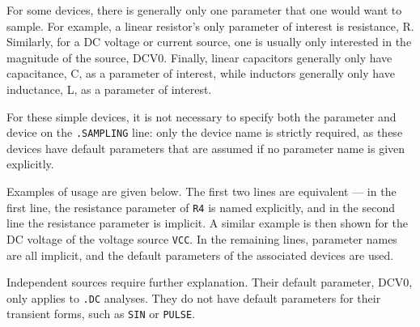 For some devices, there is generally only one parameter that one would
want to sample.  For example, a linear resistor's only parameter of
interest is resistance, R.  Similarly, for a DC voltage or current
source, one is usually only interested in the magnitude of the source, DCV0.
Finally, linear capacitors generally only have capacitance, C, as a 
parameter of interest, while inductors generally only have inductance, L,
as a parameter of interest.  

For these simple devices, it is not necessary to specify both the
parameter and device on the \texttt{.SAMPLING} line: only the device name
is strictly required, as these devices have default
parameters that are assumed if no parameter name is given explicitly.

Examples of usage are given below.  The first two lines are equivalent
--- in the first line, the resistance parameter of \texttt{R4} is
named explicitly, and in the second line the resistance parameter is
implicit. A similar example is then shown for the DC voltage of the 
voltage source \texttt{VCC}.  In the remaining lines, parameter names are all 
implicit, and the default parameters of the associated devices are used.


Independent sources require further explanation.  Their default
parameter, DCV0, only applies to \texttt{.DC} analyses.  They do not have
default parameters for their transient forms, such as \texttt{SIN}
or \texttt{PULSE}.

